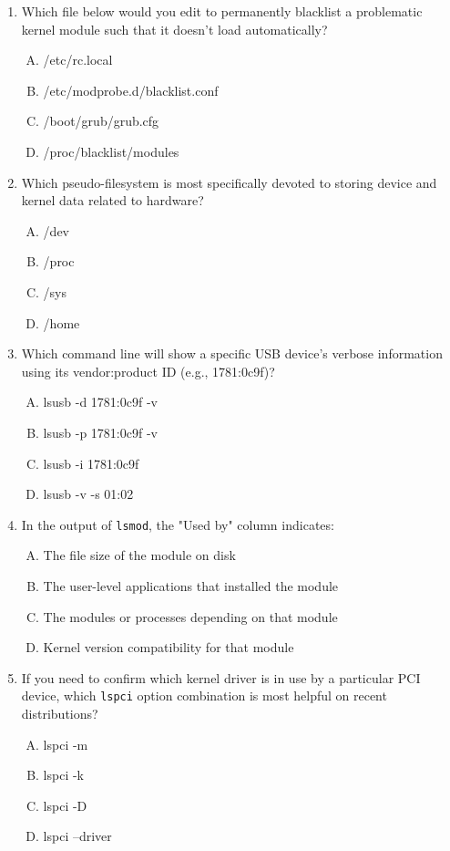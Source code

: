 \documentclass[12pt,a4paper]{report}
\begin{document}
\begin{enumerate}[1.]
\item Which file below would you edit to permanently blacklist a problematic kernel module such that it doesn't load automatically?
  \begin{enumerate}[A)]
    \item /etc/rc.local
    \item /etc/modprobe.d/blacklist.conf
    \item /boot/grub/grub.cfg
    \item /proc/blacklist/modules
  \end{enumerate}

\item Which pseudo-filesystem is most specifically devoted to storing device and kernel data related to hardware?
  \begin{enumerate}[A)]
    \item /dev
    \item /proc
    \item /sys
    \item /home
  \end{enumerate}

\item Which command line will show a specific USB device's verbose information using its vendor:product ID (e.g., 1781:0c9f)?
  \begin{enumerate}[A)]
    \item lsusb -d 1781:0c9f -v
    \item lsusb -p 1781:0c9f -v
    \item lsusb -i 1781:0c9f
    \item lsusb -v -s 01:02
  \end{enumerate}

\item In the output of \texttt{lsmod}, the "Used by" column indicates:
  \begin{enumerate}[A)]
    \item The file size of the module on disk
    \item The user-level applications that installed the module
    \item The modules or processes depending on that module
    \item Kernel version compatibility for that module
  \end{enumerate}

\item If you need to confirm which kernel driver is in use by a particular PCI device, which \texttt{lspci} option combination is most helpful on recent distributions?
  \begin{enumerate}[A)]
    \item lspci -m
    \item lspci -k
    \item lspci -D
    \item lspci --driver
  \end{enumerate}


\end{enumerate}
\end{document}
